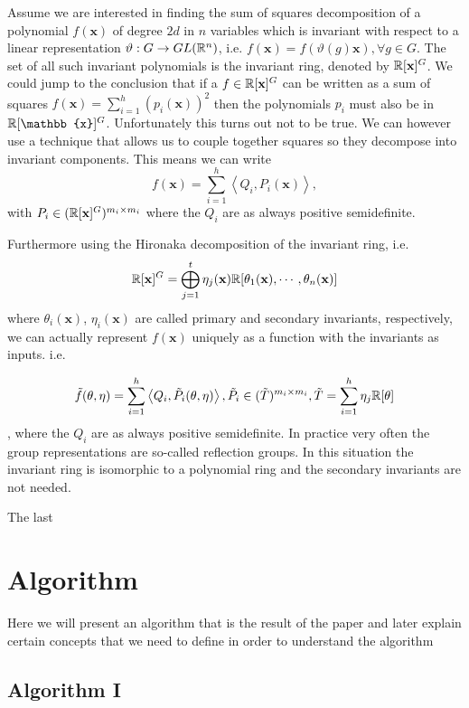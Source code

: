 \documentclass[]{article}
\begin{document}
Assume we are interested in finding the sum of squares decomposition of a polynomial $f(\textbf{x})$ of degree $2d$ in $n$
variables which is invariant with respect to a linear representation $\vartheta:G\rightarrow GL(\mathbb R^n)$, i.e. $f(\textbf{x}) = f(\vartheta(g)\textbf{x}), \forall g\in G$.
The set of all such invariant polynomials is the invariant ring, denoted by $\mathbb R[\textbf{x}]^G$. We could jump to the conclusion that if a $f\in \mathbb R[\textbf{x}]^G$ can be written as a 
sum of squares $f(\textbf{x}) =\sum_{i=1}^{h}(p_i(\textbf{x}))^2$ then the polynomials $p_i$ must also be in $\R[\mathbb{x}]^G$. Unfortunately this turns out not to be true. We can however
use a technique that allows us to couple together squares so they decompose into invariant components. This means we can write 
\[f(\textbf{x}) = \sum_{i=1}^{h}\left<Q_i,P_i(\mathbf{x})\right>,\]
with $P_i\in (\mathbb R[\mathbf{x}]^G)^{m_i\times m_i}$
where the $Q_i$ are as always positive semidefinite.


Furthermore using the Hironaka decomposition of the invariant ring, i.e.
\[\mathbb R[\mathbf{x}]^G = \bigoplus_{j=1}^{t}\eta_j(\textbf{x})\mathbb R[\theta_1(\textbf{x}), \cdots, \theta_n(\mathbf{x})]\] 
where $\theta_i(\mathbf{x})$, $\eta_i(\mathbf{x})$ are called primary and secondary invariants, respectively, 
we can actually represent $f(\mathbf{x})$ uniquely as a function with the invariants as inputs. i.e.

\[\tilde{f}(\theta,\eta) = \sum_{i=1}^{h}\left<Q_i,\tilde{P}_i(\theta,\eta)\right>, \tilde{P_i} \in (\tilde{T})^{m_i\times m_i}, \tilde{T} = \sum_{i=1}^{h}\eta_j\mathbb R[\theta]\],
where the $Q_i$ are as always positive semidefinite.
In practice very often the group representations are so-called reflection groups. In this situation the invariant ring is 
isomorphic to a polynomial ring and the secondary invariants are not needed.

The last 



\section{Algorithm}
Here we will present an algorithm that is the result of the paper and later explain certain concepts that we need to define in order to understand the algorithm

\subsection*{Algorithm I}
\end{document}
